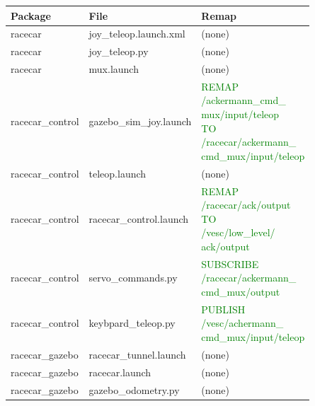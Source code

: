 \documentclass[12pt, letterpaper]{report}
\begin{document}
\begin{center}
	\begin{tabularx}{\linewidth}{|X|X|X|}
		\hline
		\textbf{Package} & \textbf{File} & \textbf{Remap} \\
		\hline
		racecar & joy\_teleop.launch.xml & (none) \\
		\hline
		racecar & joy\_teleop.py & (none) \\
		\hline
		racecar & mux.launch & (none) \\
		\hline
		racecar\_control & gazebo\_sim\_joy.launch & \parbox[t]{5cm}{\raggedright \textcolor{Green}{REMAP \\ /ackermann\_cmd\_ \\ mux/input/teleop \\ TO \\ /racecar/ackermann\_ \\ cmd\_mux/input/teleop}} \\
		\hline
		racecar\_control & teleop.launch & (none) \\
		\hline
		racecar\_control & racecar\_control.launch & \parbox[t]{5cm}{\raggedright \textcolor{Green}{REMAP \\ /racecar/ack/output \\ TO \\ /vesc/low\_level/ \\ ack/output}} \\
		\hline
		racecar\_control & servo\_commands.py & \parbox[t]{5cm}{\raggedright \textcolor{Green}{SUBSCRIBE \\ /racecar/ackermann\_ \\ cmd\_mux/output}} \\
		\hline
		racecar\_control & keybpard\_teleop.py & \parbox[t]{5cm}{\raggedright \textcolor{Green}{PUBLISH \\ /vesc/achermann\_ \\ cmd\_mux/input/teleop}} \\
		\hline
		racecar\_gazebo & racecar\_tunnel.launch & (none) \\
		\hline
		racecar\_gazebo & racecar.launch & (none) \\
		\hline
		racecar\_gazebo & gazebo\_odometry.py & (none) \\
		\hline
	\end{tabularx}
\end{center}
\end{document}
